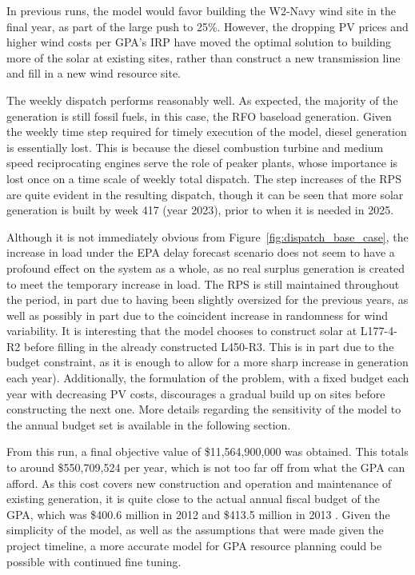\documentclass[12pt,letterpaper,fleqn]{article}
\begin{document}
In previous runs, the model would favor building the W2-Navy wind site
in the final year, as part of the large push to 25\%. However, the
dropping PV prices and higher wind costs per GPA’s IRP have moved the
optimal solution to building more of the solar at existing sites,
rather than construct a new transmission line and fill in a new wind
resource site. 

The weekly dispatch performs reasonably well. As expected, the
majority of the generation is still fossil fuels, in this case, the
RFO baseload generation. Given the weekly time step required for
timely execution of the model, diesel generation is essentially
lost. This is because the diesel combustion turbine and medium speed
reciprocating engines serve the role of peaker plants, whose
importance is lost once on a time scale of weekly total dispatch. The
step increases of the RPS are quite evident in the resulting dispatch,
though it can be seen that more solar generation is built by week 417
(year 2023), prior to when it is needed in 2025. 

Although it is not immediately obvious from
Figure~\ref{fig:dispatch_base_case}, the increase in load under the
EPA delay forecast scenario does not seem to have a profound effect on
the system as a whole, as no real surplus generation is created to
meet the temporary increase in load. The RPS is still maintained
throughout the period, in part due to having been slightly oversized
for the previous years, as well as possibly in part due to the
coincident increase in randomness for wind variability. It is
interesting that the model chooses to construct solar at L177-4-R2
before filling in the already constructed L450-R3. This is in part due
to the budget constraint, as it is enough to allow for a more sharp
increase in generation each year). Additionally, the formulation of
the problem, with a fixed budget each year with decreasing PV costs,
discourages a gradual build up on sites before constructing the next
one. More details regarding the sensitivity of the model to the annual
budget set is available in the following section.

From this run, a final objective value of \$11,564,900,000 was
obtained. This totals to around \$550,709,524 per year, which is not
too far off from what the GPA can afford. As this cost covers new
construction and operation and maintenance of existing generation, it
is quite close to the actual annual fiscal budget of the GPA, which
was \$400.6 million in 2012 and \$413.5 million in 2013
\cite{cruz13}. Given the simplicity of the model, as well as the
assumptions that were made given the project timeline, a more accurate
model for GPA resource planning could be possible with continued fine
tuning.
\end{document}
